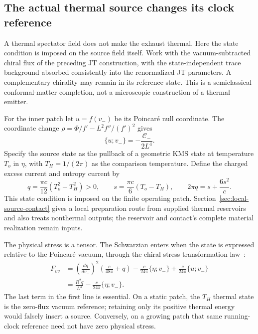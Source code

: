 \documentclass[12pt,a4paper]{article}
\begin{document}
\subsection{The actual thermal source changes its clock reference}
\label{sec:thermal-source-clock}

A thermal spectator field does not make the exhaust thermal. Here the
state condition is imposed on the source field itself. Work with the
vacuum-subtracted chiral flux of the preceding JT construction, with the
state-independent trace background absorbed consistently into the
renormalized JT parameters. A complementary chirality may remain in its
reference state. This is a semiclassical conformal-matter completion,
not a microscopic construction of a thermal emitter.

For the inner patch let $u=f(v_-)$ be its Poincar\'e null coordinate.
The coordinate change
$\rho=\Phi/f'-L^2f''/(f')^2$ gives
\[
 \{u;v_-\}=-\frac{\mathcal C_-}{2L^4}.
\]
Specify the source state as the pullback of a geometric KMS state at
temperature $T_o$ in $\eta$, with $T_H=1/(2\pi)$ as the comparison
temperature. Define the charged excess current and entropy current by
\begin{equation}\label{eq:thermal-source-excess}
 q=\frac{\pi c}{12}(T_o^2-T_H^2)>0,\qquad
 s=\frac{\pi c}{6}(T_o-T_H),\qquad
 2\pi q=s+\frac{6s^2}{c}.
\end{equation}
This state condition is imposed on the finite operating patch.
Section~\ref{sec:local-source-contact} gives a local preparation route
from supplied thermal reservoirs and also treats nonthermal outputs;
the reservoir and contact's complete material realization remain inputs.

The physical stress is a tensor. The Schwarzian enters when the state is
expressed relative to the Poincar\'e vacuum, through the chiral stress
transformation law~\cite[Eq.~(2.14)]{Hollands2019}:
\begin{align}\label{eq:actual-thermal-source}
 F_{vv}&=\left(\frac{d\eta}{dv_-}\right)^2
              \left(\frac{c}{48\pi}+q\right)
       -\frac{c}{24\pi}\{\eta;v_-\}
       +\frac{c}{24\pi}\{u;v_-\}\nonumber\\
       &=\frac{R^2q}{L^4}-\frac{c}{24\pi}\{\eta;v_-\}.
\end{align}
The last term in the first line is essential. On a static patch, the
$T_H$ thermal state is the zero-flux vacuum reference; retaining only its
positive thermal energy would falsely insert a source. Conversely, on a
growing patch that same running-clock reference need not have zero
physical stress.
\end{document}
